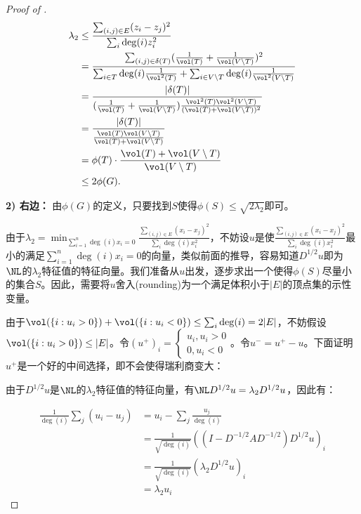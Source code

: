 \documentclass[lang=cn,newtx,10pt,scheme=chinese,chinesefont=nofont,citestyle=gb7714-2015, bibstyle=gb7714-2015]{elegantbook}
\providecommand{\abs}[1]{\lvert#1\rvert}
\begin{document}
\begin{refsection}
\begin{proof}[Proof of ]
\begin{align*}
    \lambda_2
    &\leq\frac{\sum_{(i,j)\in E}(z_i-z_j)^2}{\sum_{i}\deg(i)z_i^2}\\
    &=\frac{\sum_{(i,j)\in\delta(T)}(\frac{1}{\vol(T)}+\frac{1}{\vol(V\setminus T)})^2}{\sum_{i\in T}\deg(i)\frac{1}{\vol^2(T)}+\sum_{i\in V\setminus T}\deg(i)\frac{1}{\vol^2(V\setminus T)}}\\
    &=\frac{\abs{\delta(T)}}{(\frac{1}{\vol(T)}+\frac{1}{\vol(V\setminus T)})\frac{\vol^2(T)\vol^2(V\setminus T)}{(\vol(T)+\vol(V\setminus T))^2}}\\
    &=\frac{\abs{\delta(T)}}{\frac{\vol(T)\vol(V\setminus T)}{\vol(T)+\vol(V\setminus T)}}\\
    &=\phi(T)\cdot\frac{\vol(T)+\vol(V\setminus T)}{\vol(V\setminus T)}\\
    &\leq2\phi(G).
\end{align*}

\textbf{2) 右边：}
由$\phi(G)$的定义，只要找到$S$使得$\phi(S)\leq\sqrt{2\lambda_2}$即可。

由于$\lambda_2=\min_{\sum_{i=1}^n\deg(i)x_i=0}\frac{\sum_{(i,j)\in E}(x_i-x_j)^2}{\sum_{i}\deg(i)x_i^2}$，不妨设$u$是使$\frac{\sum_{(i,j)\in E}(x_i-x_j)^2}{\sum_{i}\deg(i)x_i^2}$最小的满足$\sum_{i=1}^n\deg(i)x_i=0$的向量，类似前面的推导，容易知道$D^{1/2}u$即为$\NL$的$\lambda_2$特征值的特征向量。我们准备从$u$出发，逐步求出一个使得$\phi(S)$尽量小的集合$S$。因此，需要将$u$舍入(rounding)为一个满足体积小于$\abs{E}$的顶点集的示性变量。

由于$\vol(\{i:u_i>0\})+\vol(\{i:u_i<0\})\leq\sum_i\deg(i)=2\abs{E}$，不妨假设$\vol(\{i:u_i>0\})\leq\abs{E}$。令$(u^+)_i=\begin{cases}
    u_i,u_i>0\\
    0,u_i<0
\end{cases}$。令$u^-=u^+-u$。下面证明$u^+$是一个好的中间选择，即不会使得瑞利商变大：

由于$D^{1/2}u$是$\NL$的$\lambda_2$特征值的特征向量，有$\NL D^{1/2}u=\lambda_2D^{1/2}u$，因此有：

\begin{align*}
    \frac{1}{\deg(i)}\sum_{j}(u_i-u_j)&=u_i-\sum_j\frac{u_j}{\deg(i)}\\
    &=\frac{1}{\sqrt{\deg(i)}}\left((I-D^{-1/2}AD^{-1/2})D^{1/2}u\right)_i\\
    &=\frac{1}{\sqrt{\deg(i)}}\left(\lambda_2 D^{1/2}u\right)_i\\
    &=\lambda_2u_i
\end{align*}


\end{proof}
\end{refsection}
\end{document}
